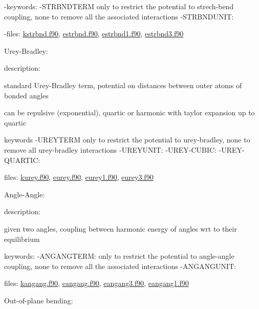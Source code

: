 \begin{DoxyItemize}
-\/keywords\-: -\/\-S\-T\-R\-B\-N\-D\-T\-E\-R\-M only to restrict the potential to strech-\/bend coupling, none to remove all the associated interactions -\/\-S\-T\-R\-B\-N\-D\-U\-N\-I\-T\-:

-\/files\-: \hyperlink{kstrbnd_8f90}{kstrbnd.\-f90}, \hyperlink{estrbnd_8f90}{estrbnd.\-f90}, \hyperlink{estrbnd1_8f90}{estrbnd1.\-f90}, \hyperlink{estrbnd3_8f90}{estrbnd3.\-f90}
\item Urey-\/\-Bradley\-:
\begin{DoxyItemize}
\item description\-:
\begin{DoxyItemize}
\item standard Urey-\/\-Bradley term, potential on distances between outer atoms of bonded angles
\item can be repulsive (exponential), quartic or harmonic with taylor expansion up to quartic
\end{DoxyItemize}
\item keywords -\/\-U\-R\-E\-Y\-T\-E\-R\-M only to restrict the potential to urey-\/bradley, none to remove all urey-\/bradley interactions -\/\-U\-R\-E\-Y\-U\-N\-I\-T\-: -\/\-U\-R\-E\-Y-\/\-C\-U\-B\-I\-C\-: -\/\-U\-R\-E\-Y-\/\-Q\-U\-A\-R\-T\-I\-C\-:
\item files\-: \hyperlink{kurey_8f90}{kurey.\-f90}, \hyperlink{eurey_8f90}{eurey.\-f90}, \hyperlink{eurey1_8f90}{eurey1.\-f90}, \hyperlink{eurey3_8f90}{eurey3.\-f90}
\end{DoxyItemize}
\item Angle-\/\-Angle\-:
\begin{DoxyItemize}
\item description\-:
\begin{DoxyItemize}
\item given two angles, coupling between harmonic energy of angles wrt to their equilibrium
\end{DoxyItemize}
\item keywords\-: -\/\-A\-N\-G\-A\-N\-G\-T\-E\-R\-M\-: only to restrict the potential to angle-\/angle coupling, none to remove all the associated interactions -\/\-A\-N\-G\-A\-N\-G\-U\-N\-I\-T\-:
\item files\-: \hyperlink{kangang_8f90}{kangang.\-f90}, \hyperlink{eangang_8f90}{eangang.\-f90}, \hyperlink{eangang3_8f90}{eangang3.\-f90}, \hyperlink{eangang1_8f90}{eangang1.\-f90}
\end{DoxyItemize}
\item Out-\/of-\/plane bending\-:
\begin{DoxyItemize}

\end{DoxyItemize}
\end{DoxyItemize}

